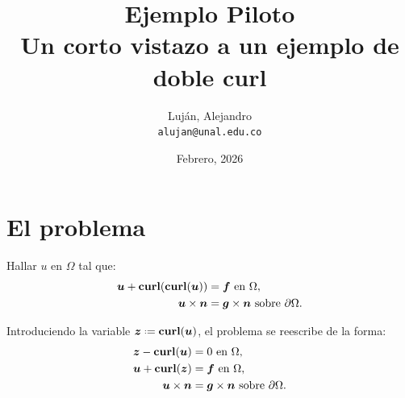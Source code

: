 \documentclass{article}
\title{
   Ejemplo Piloto  \\
  \large Un corto vistazo a un ejemplo de doble curl}
\author{
    Luján, Alejandro\\
    \texttt{alujan@unal.edu.co}
}
\date{Febrero, 2026}
\begin{document}
\newcommand{\vol}[2]{(#1, #2)_K}
\newcommand{\face}[2]{\langle #1, #2 \rangle_{\partial K}}
\newcommand{\facee}[2]{\langle #1, #2 \rangle_{e}}
\newcommand{\frontier}[2]{\langle #1, #2 \rangle_{\partial \Omega}}

\newcommand*{\defeq}{\mathrel{\vcenter{\baselineskip0.5ex \lineskiplimit0pt \hbox{\scriptsize.}\hbox{\scriptsize.}}}=}
\newcommand{\vect}[1]{\boldsymbol{#1}}

\newcommand*{\curl}[1]{\textbf{\textup{curl}}(\vect{#1})}


\maketitle


\section{El problema}

\noindent Hallar $u$ en $\Omega$ tal que:
\begin{align*}
    \vect{u} + \textbf{curl}(\curl{u}) &= \vect{f}~\textup{en}~\Omega, \\
    \vect{u} \times \vect{n} &= \vect{g} \times \vect{n}~\textup{sobre}~\partial \Omega.
\end{align*}

\noindent Introduciendo la variable $\vect{z} \defeq \curl{u}$, el problema se reescribe de la forma:
\begin{align*}
    \vect{z} - \curl{u} &= 0~\textup{en}~\Omega, \\
    \vect{u} + \curl{z} &= \vect{f}~\textup{en}~\Omega, \\
    \vect{u} \times \vect{n} &= \vect{g} \times \vect{n}~\textup{sobre}~\partial \Omega.
\end{align*}
\end{document}

